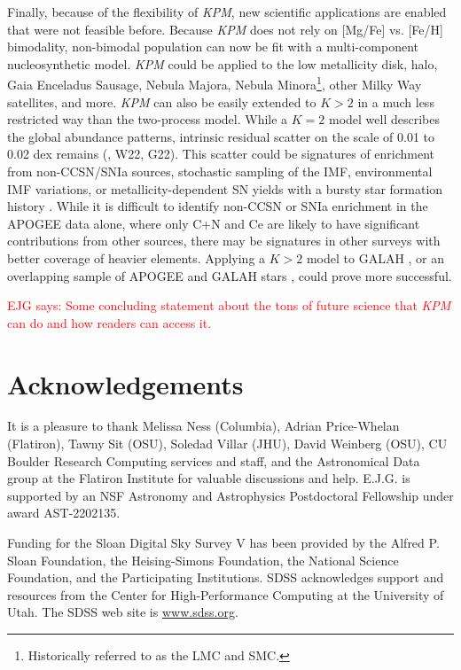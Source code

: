 \documentclass[modern]{aastex631}
\newcommand{\ejg}[1]{\textcolor{red}{EJG says: #1}}
\newcommand{\name}{\textsl{KPM}}
\begin{document}
Finally, because of the flexibility of \name{}, new scientific applications are enabled that were not feasible before. Because \name{} does not rely on [Mg/Fe] vs. [Fe/H] bimodality, non-bimodal population can now be fit with a multi-component nucleosynthetic model. \name{} could be applied to the low metallicity disk, halo, Gaia Enceladus Sausage, Nebula Majora, Nebula Minora\footnote{Historically referred to as the LMC and SMC.}, other Milky Way satellites, and more. \name{} can also be easily extended to $K>2$ in a much less restricted way than the two-process model. While a $K=2$ model well describes the global abundance patterns, intrinsic residual scatter on the scale of 0.01 to 0.02 dex remains (\citealp{ting2022}, W22, G22). This scatter could be signatures of enrichment from non-CCSN/SNIa sources, stochastic sampling of the IMF, environmental IMF variations, or metallicity-dependent SN yields with a bursty star formation history \citep[e.g.][]{belokurov2022, griffith2023}. While it is difficult to identify non-CCSN or SNIa enrichment in the APOGEE data alone, where only C+N and Ce are likely to have significant contributions from other sources, there may be signatures in other surveys with better coverage of heavier elements. Applying a $K>2$ model to GALAH \citep{buder2021}, or an overlapping sample of APOGEE and GALAH stars \citep{nandakumar2022}, could prove more successful.

\ejg{Some concluding statement about the tons of future science that \name{} can do and how readers can access it.}

\section{Acknowledgements}
It is a pleasure to thank
  Melissa Ness (Columbia),
  Adrian Price-Whelan (Flatiron),
  Tawny Sit (OSU),
  Soledad Villar (JHU),
  David Weinberg (OSU),
  CU Boulder Research Computing services and staff,
  and the Astronomical Data group at the Flatiron Institute
for valuable discussions and help.
E.J.G. is supported by an NSF Astronomy and Astrophysics Postdoctoral Fellowship under award AST-2202135.

Funding for the Sloan Digital Sky Survey V has been provided by the Alfred P. Sloan Foundation, the Heising-Simons Foundation, the National Science Foundation, and the Participating Institutions. SDSS acknowledges support and resources from the Center for High-Performance Computing at the University of Utah. The SDSS web site is \url{www.sdss.org}.
\end{document}
